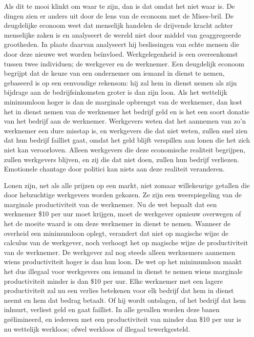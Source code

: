 \documentclass[
  a5paper,
  smalldemyvopaper,11pt,twoside,onecolumn,openright,extrafontsizes,
hidelinks]{memoir}
\begin{document}
Als dit te mooi klinkt om waar te zijn, dan is dat omdat het niet waar
is. De dingen zien er anders uit door de lens van de econoom met de
Mises-bril. De deugdelijke econoom weet dat menselijk handelen de
drijvende kracht achter menselijke zaken is en analyseert de wereld niet
door middel van geaggregeerde grootheden. In plaats daarvan analyseert
hij beslissingen van echte mensen die door deze nieuwe wet worden
beïnvloed. Werkgelegenheid is een overeenkomst tussen twee individuen;
de werkgever en de werknemer. Een deugdelijk econoom begrijpt dat de
keuze van een ondernemer om iemand in dienst te nemen, gebaseerd is op
een eenvoudige rekensom: hij zal hem in dienst nemen als zijn bijdrage
aan de bedrijfsinkomsten groter is dan zijn loon. Als het wettelijk
minimumloon hoger is dan de marginale opbrengst van de werknemer, dan
kost het in dienst nemen van de werknemer het bedrijf geld en is het een
soort donatie van het bedrijf aan de werknemer. Werkgevers weten dat het
aannemen van zo'n werknemer een dure misstap is, en werkgevers die dat
niet weten, zullen snel zien dat hun bedrijf failliet gaat, omdat het
geld blijft verspillen aan lonen die het zich niet kan veroorloven.
Alleen werkgevers die deze economische realiteit begrijpen, zullen
werkgevers blijven, en zij die dat niet doen, zullen hun bedrijf
verliezen. Emotionele chantage door politici kan niets aan deze
realiteit veranderen.

Lonen zijn, net als alle prijzen op een markt, niet zomaar willekeurige
getallen die door hebzuchtige werkgevers worden gekozen. Ze zijn een
weerspiegeling van de marginale productiviteit van de werknemer. Nu de
wet bepaalt dat een werknemer \$10 per uur moet krijgen, moet de
werkgever opnieuw overwegen of het de moeite waard is om deze werknemer
in dienst te nemen. Wanneer de overheid een minimumloon oplegt,
verandert dat niet op magische wijze de calculus van de werkgever, noch
verhoogt het op magische wijze de productiviteit van de werknemer. De
werkgever zal nog steeds alleen werknemers aannemen wiens productiviteit
hoger is dan hun loon. De wet op het minimumloon maakt het dus illegaal
voor werkgevers om iemand in dienst te nemen wiens marginale
productiviteit minder is dan \$10 per uur. Elke werknemer met een lagere
productiviteit zal nu een verlies betekenen voor elk bedrijf dat hem in
dienst neemt en hem dat bedrag betaalt. Of hij wordt ontslagen, of het
bedrijf dat hem inhuurt, verliest geld en gaat failliet. In alle
gevallen worden deze banen geëlimineerd, en iedereen met een
productiviteit van minder dan \$10 per uur is nu wettelijk werkloos;
ofwel werkloos of illegaal tewerkgesteld.
\end{document}
